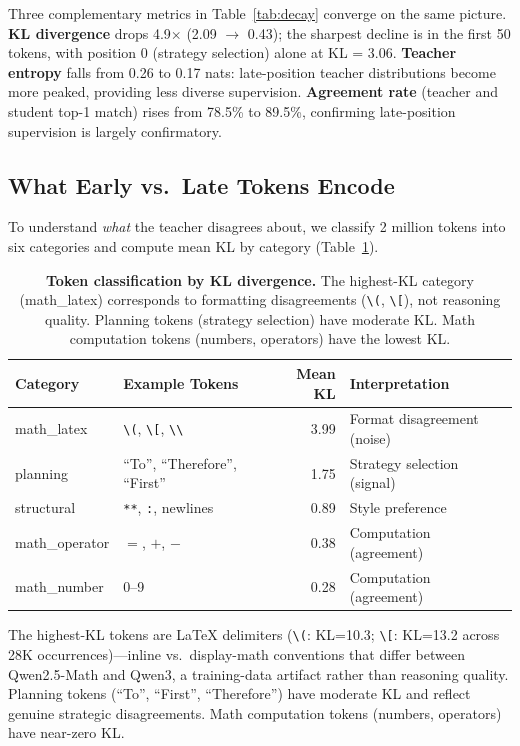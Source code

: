 \documentclass[10pt]{article}
\begin{document}
Three complementary metrics in Table~\ref{tab:decay} converge on the same picture.
\textbf{KL divergence} drops 4.9$\times$ (2.09 $\to$ 0.43); the sharpest decline is in the first 50 tokens, with position 0 (strategy selection) alone at KL = 3.06.
\textbf{Teacher entropy} falls from 0.26 to 0.17 nats: late-position teacher distributions become more peaked, providing less diverse supervision.
\textbf{Agreement rate} (teacher and student top-1 match) rises from 78.5\% to 89.5\%, confirming late-position supervision is largely confirmatory.

\subsection{What Early vs.\ Late Tokens Encode}
\label{sec:token_class}

To understand \emph{what} the teacher disagrees about, we classify 2 million tokens into six categories and compute mean KL by category (Table~\ref{tab:token_class}).

\begin{table}[t]
\centering
\caption{\textbf{Token classification by KL divergence.} The highest-KL category (math\_latex) corresponds to formatting disagreements (\texttt{\textbackslash(}, \texttt{\textbackslash[}), not reasoning quality. Planning tokens (strategy selection) have moderate KL. Math computation tokens (numbers, operators) have the lowest KL.}
\label{tab:token_class}
\small
\begin{tabular}{@{}llrl@{}}
\toprule
\textbf{Category} & \textbf{Example Tokens} & \textbf{Mean KL} & \textbf{Interpretation} \\
\midrule
math\_latex    & \texttt{\textbackslash(}, \texttt{\textbackslash[}, \texttt{\textbackslash\textbackslash} & 3.99 & Format disagreement (noise) \\
planning       & ``To'', ``Therefore'', ``First'' & 1.75 & Strategy selection (signal) \\
structural     & \texttt{**}, \texttt{:}, newlines & 0.89 & Style preference \\
math\_operator & $=$, $+$, $-$                    & 0.38 & Computation (agreement) \\
math\_number   & 0--9                              & 0.28 & Computation (agreement) \\
\bottomrule
\end{tabular}
\end{table}

The highest-KL tokens are LaTeX delimiters (\texttt{\textbackslash(}: KL=10.3; \texttt{\textbackslash[}: KL=13.2 across 28K occurrences)---inline vs.\ display-math conventions that differ between Qwen2.5-Math and Qwen3, a training-data artifact rather than reasoning quality.
Planning tokens (``To'', ``First'', ``Therefore'') have moderate KL and reflect genuine strategic disagreements.
Math computation tokens (numbers, operators) have near-zero KL.
\end{document}
